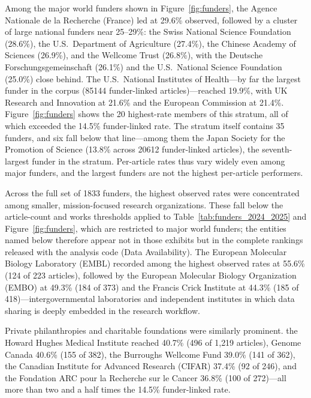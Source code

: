 Among the major world funders shown in Figure~\ref{fig:funders}, the Agence Nationale de la Recherche (France) led at 29.6\% observed, followed by a cluster of large national funders near 25--29\%: the Swiss National Science Foundation (28.6\%), the U.S.\ Department of Agriculture (27.4\%), the Chinese Academy of Sciences (26.9\%), and the Wellcome Trust (26.8\%), with the Deutsche Forschungsgemeinschaft (26.1\%) and the U.S.\ National Science Foundation (25.0\%) close behind. The U.S.\ National Institutes of Health---by far the largest funder in the corpus (\num{85144} funder-linked articles)---reached 19.9\%, with UK Research and Innovation at 21.6\% and the European Commission at 21.4\%. Figure~\ref{fig:funders} shows the 20 highest-rate members of this stratum, all of which exceeded the 14.5\% funder-linked rate. The stratum itself contains 35 funders, and six fall below that line---among them the Japan Society for the Promotion of Science (13.8\% across \num{20612} funder-linked articles), the seventh-largest funder in the stratum. Per-article rates thus vary widely even among major funders, and the largest funders are not the highest per-article performers.

Across the full set of \num{1833} funders, the highest observed rates were concentrated among smaller, mission-focused research organizations. These fall below the article-count and works thresholds applied to Table~\ref{tab:funders_2024_2025} and Figure~\ref{fig:funders}, which are restricted to major world funders; the entities named below therefore appear not in those exhibits but in the complete rankings released with the analysis code (Data Availability). The European Molecular Biology Laboratory (EMBL) recorded among the highest observed rates at 55.6\% (124 of 223 articles), followed by the European Molecular Biology Organization (EMBO) at 49.3\% (184 of 373) and the Francis Crick Institute at 44.3\% (185 of 418)---intergovernmental laboratories and independent institutes in which data sharing is deeply embedded in the research workflow.

Private philanthropies and charitable foundations were similarly prominent. the Howard Hughes Medical Institute reached 40.7\% (496 of 1{,}219 articles), Genome Canada 40.6\% (155 of 382), the Burroughs Wellcome Fund 39.0\% (141 of 362), the Canadian Institute for Advanced Research (CIFAR) 37.4\% (92 of 246), and the Fondation ARC pour la Recherche sur le Cancer 36.8\% (100 of 272)---all more than two and a half times the 14.5\% funder-linked rate.

